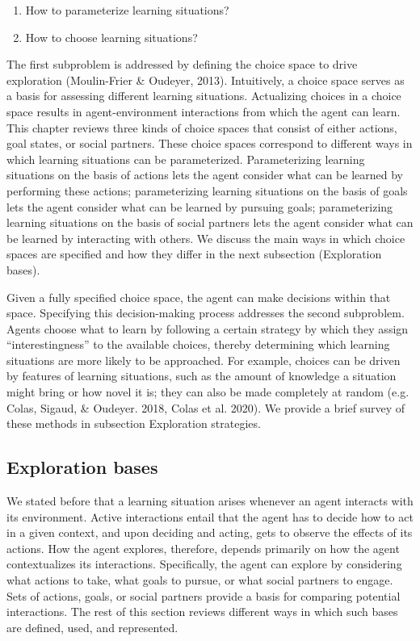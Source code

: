 \begin{enumerate}
    \item How to parameterize learning situations?
    \item How to choose learning situations?
\end{enumerate}

The first subproblem is addressed by defining the choice space to drive exploration (Moulin-Frier \& Oudeyer, 2013). Intuitively, a choice space serves as a basis for assessing different learning situations. Actualizing choices in a choice space results in agent-environment interactions from which the agent can learn. This chapter reviews three kinds of choice spaces that consist of either actions, goal states, or social partners. These choice spaces correspond to different ways in which learning situations can be parameterized. Parameterizing learning situations on the basis of actions lets the agent consider what can be learned by performing these actions; parameterizing learning situations on the basis of goals lets the agent consider what can be learned by pursuing goals; parameterizing learning situations on the basis of social partners lets the agent consider what can be learned by interacting with others. We discuss the main ways in which choice spaces are specified and how they differ in the next subsection (Exploration bases).

Given a fully specified choice space, the agent can make decisions within that space. Specifying this decision-making process addresses the second subproblem. Agents choose what to learn by following a certain strategy by which they assign “interestingness” to the available choices, thereby determining which learning situations are more likely to be approached. For example, choices can be driven by features of learning situations, such as the amount of knowledge a situation might bring or how novel it is; they can also be made completely at random (e.g. Colas, Sigaud, \& Oudeyer. 2018, Colas et al. 2020). We provide a brief survey of these methods in subsection Exploration strategies.

\subsection{Exploration bases}
We stated before that a learning situation arises whenever an agent interacts with its environment. Active interactions entail that the agent has to decide how to act in a given context, and upon deciding and acting, gets to observe the effects of its actions. How the agent explores, therefore, depends primarily on how the agent contextualizes its interactions. Specifically, the agent can explore by considering what actions to take, what goals to pursue, or what social partners to engage. Sets of actions, goals, or social partners provide a basis for comparing potential interactions. The rest of this section reviews different ways in which such bases are defined, used, and represented.

